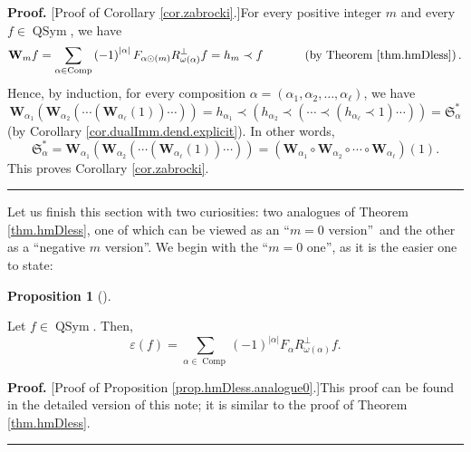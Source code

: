 \documentclass
[numbers=enddot,12pt,final,onecolumn,notitlepage,abstracton]{scrartcl}%
\theoremstyle{definition}
\newtheorem{prop}[theo]{Proposition}
\newenvironment{proposition}[1][]
{\begin{prop}[#1]\begin{leftbar}}
{\end{leftbar}\end{prop}}
\newenvironment{proof}[1][Proof]{\noindent\textbf{#1.} }{\ \rule{0.5em}{0.5em}}
\newenvironment{vershort}{}{}
\let\sumnonlimits\sum
\renewcommand{\sum}{\sumnonlimits\limits}
\begin{document}
\begin{proof}
[Proof of Corollary \ref{cor.zabrocki}.]For every positive integer $m$ and
every $f\in\operatorname*{QSym}$, we have%
\[
\mathbf{W}_{m}f=\sum_{\alpha\in\operatorname*{Comp}}\left(  -1\right)
^{\left\vert \alpha\right\vert }F_{\alpha\odot\left(  m\right)  }%
R_{\omega\left(  \alpha\right)  }^{\perp}f=h_{m}\left.  \prec\right.
f\ \ \ \ \ \ \ \ \ \ \left(  \text{by Theorem \ref{thm.hmDless}}\right)  .
\]
Hence, by induction, for every composition $\alpha=\left(  \alpha_{1}%
,\alpha_{2},\ldots,\alpha_{\ell}\right)  $, we have%
\[
\mathbf{W}_{\alpha_{1}}\left(  \mathbf{W}_{\alpha_{2}}\left(  \cdots\left(
\mathbf{W}_{\alpha_{\ell}}\left(  1\right)  \right)  \cdots\right)  \right)
=h_{\alpha_{1}}\left.  \prec\right.  \left(  h_{\alpha_{2}}\left.
\prec\right.  \left(  \cdots\left.  \prec\right.  \left(  h_{\alpha_{\ell}%
}\left.  \prec\right.  1\right)  \cdots\right)  \right)  =\mathfrak{S}%
_{\alpha}^{\ast}%
\]
(by Corollary \ref{cor.dualImm.dend.explicit}). In other words,%
\[
\mathfrak{S}_{\alpha}^{\ast}=\mathbf{W}_{\alpha_{1}}\left(  \mathbf{W}%
_{\alpha_{2}}\left(  \cdots\left(  \mathbf{W}_{\alpha_{\ell}}\left(  1\right)
\right)  \cdots\right)  \right)  =\left(  \mathbf{W}_{\alpha_{1}}%
\circ\mathbf{W}_{\alpha_{2}}\circ\cdots\circ\mathbf{W}_{\alpha_{\ell}}\right)
\left(  1\right)  .
\]
This proves Corollary \ref{cor.zabrocki}.
\end{proof}

Let us finish this section with two curiosities: two analogues of Theorem
\ref{thm.hmDless}, one of which can be viewed as an \textquotedblleft$m=0$
version\textquotedblright\ and the other as a \textquotedblleft negative $m$
version\textquotedblright. We begin with the \textquotedblleft$m=0$
one\textquotedblright, as it is the easier one to state:

\begin{proposition}
\label{prop.hmDless.analogue0}Let $f\in\operatorname*{QSym}$. Then,%
\[
\varepsilon\left(  f\right)  =\sum_{\alpha\in\operatorname*{Comp}}\left(
-1\right)  ^{\left\vert \alpha\right\vert }F_{\alpha}R_{\omega\left(
\alpha\right)  }^{\perp}f.
\]

\end{proposition}

\begin{vershort}
\begin{proof}
[Proof of Proposition \ref{prop.hmDless.analogue0}.]This proof can be found in
the detailed version of this note; it is similar to the proof of Theorem
\ref{thm.hmDless}.
\end{proof}
\end{vershort}
\end{document}

